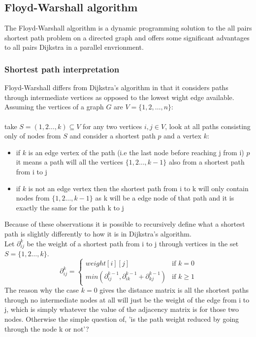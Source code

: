 \documentclass[12pt]{article}
\begin{document}
\subsection{Floyd-Warshall algorithm}

The Floyd-Warshall algorithm is a dynamic programming solution to the all pairs shortest path problem on a directed graph and offers some significant advantages to all pairs Dijkstra in a parallel envrionment.

\subsubsection{Shortest path interpretation}

Floyd-Warshall differs from Dijkstra's algorithm in that it considers paths through intermediate vertices as opposed to the lowest wight edge available. Assuming the vertices of a graph $G$ are $V = \{1,2,\dots, n\}$: \\\\
take \(S=(1,2\dots,k) \subseteq V\) for any two vertices \(i,j \in V\), look at all paths consisting only of nodes from $S$ and consider a shortest path $p$ and a vertex $k$:
\begin{itemize}
    \item if $k$ is an edge vertex of the path (i.e the last node before reaching j from i)
    $p$ it means a path will all the vertices \(\{1,2\dots,k-1\}\) also from a shortest path from i to j
    \item if $k$ is not an edge vertex then the shortest path from i to k will only contain nodes from \(\{1,2\dots,k-1\}\) as k will be a edge node of that path and it is exactly the same for the path k to j \cite{Cormen:2009:IAT:1614191}
\end{itemize}
Because of these observations it is possible to recursively define what a shortest path is slightly differently to how it is in Dijkstra's algorithm. 
\\
Let \(\partial^k_{ij}\) be the weight of a shortest path from i to j through vertices in the set \(S = \{1,2 \dots, k\}\). 
\[
\partial^k_{ij} = \begin{cases} weight[i][j] & \mbox{if } k=0 \\
min(\partial^{k-1}_{ij}, \partial^{k-1}_{ik} + \partial^{k-1}_{kj}) & \mbox{if } k \geq 1 \end{cases}
\]
The reason why the case $k=0$ gives the distance matrix is all the shortest paths through no intermediate nodes at all will just be the weight of the edge from i to j, which is simply whatever the value of the adjacency matrix is for those two nodes. Otherwise the simple question of, 'is the path weight reduced by going through the node k or not'? 
\end{document}
